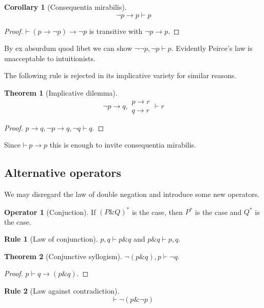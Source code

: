 \documentclass{amsbook}
\newcommand{\infers}{\mathrel\vdash}
\newcommand{\theorem}{\mathord\vdash\medspace}
\newcommand{\then}{\mathrel\rightarrow}
\newcommand{\conj}{\mathrel\&}
\theoremstyle{definition}
\newtheorem{frule}{Rule}[chapter]
\newtheorem{op}{Operator}[chapter]
\newtheorem{thm}{Theorem}[section]
\newtheorem{crl}{Corollary}[section]
\begin{document}
\begin{crl}[Consequentia mirabilis]
    $$\neg p \then p \infers p$$
    \begin{proof}
        $\theorem (p \then \neg p) \then \neg p$ is transitive with $\neg p \then p$.
    \end{proof}
\end{crl}

By ex absurdum quod libet we can show $\neg\neg p, \neg p \infers p$. Evidently Peirce's law is unacceptable to intuitionists.

The following rule is rejected in its implicative variety for similar reasons.

\begin{thm}[Implicative dilemma]
    $$\neg p \then q, \begin{aligned}
            p \then r \\
            q \then r
        \end{aligned} \infers r$$
    \begin{proof}
        $p \then q, \neg p \then q, \neg q \infers q$.
    \end{proof}
\end{thm}

Since $\theorem p \then p$ this is enough to invite consequentia mirabilis.

\subsection{Alternative operators}

We may disregard the law of double negation and introduce some new operators.

\begin{op}[Conjuction]
    If $(P \conj Q)^*$ is the case, then $P^*$ is the case and $Q^*$ is the case.
\end{op}

\begin{frule}[Law of conjunction]
    $p, q \infers p \conj q$ and $p \conj q \infers p, q$.
\end{frule}

\begin{thm}[Conjunctive syllogism]
    $\neg(p \conj q), p \infers \neg q$.
    \begin{proof}
        $p \infers q \then (p \conj q)$.
    \end{proof}
\end{thm}

\begin{frule}[Law against contradiction]
    $$\theorem \neg(p \conj \neg p)$$
\end{frule}
\end{document}
